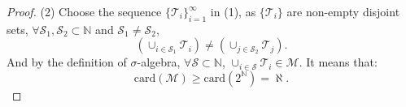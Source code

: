 \documentclass{article}
\begin{document}
\begin{proof}
    (2) Choose the sequence 
    $\{\mathcal{T}_{i}\}_{i=1}^{\infty}$ in (1), 
    as $\{\mathcal{T}_{i}\}$ are non-empty disjoint sets, 
    $\forall \mathcal{S}_{1},\mathcal{S}_{2}\subset\mathbb{N}$ 
    and $\mathcal{S}_{1}\neq\mathcal{S}_{2}$, 
    \begin{displaymath}
        \left(\cup_{i\in\mathcal{S}_{1}}\mathcal{T}_{i}\right)
        \neq
        \left(\cup_{j\in\mathcal{S}_{2}}\mathcal{T}_{j}\right).
    \end{displaymath}
    And by the definition of $\sigma$-algebra, 
    $\forall\mathcal{S}\subset\mathbb{N}$, 
    $\cup_{i\in\mathcal{S}}\mathcal{T}_{i}\in\mathcal{M}$.
    It means that:
    \begin{displaymath}
        \text{card}(\mathcal{M})\ge\text{card}
        \left(2^{\mathbb{N}}\right)
        =\aleph.
    \end{displaymath}
\end{proof}
\end{document}

